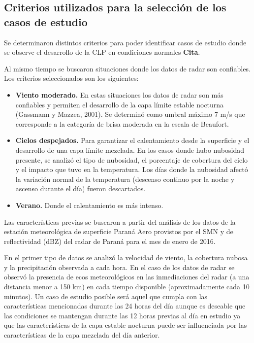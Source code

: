 \documentclass[12pt,spanish,oneside]{book}
\providecommand{\tightlist}{%
  \setlength{\itemsep}{0pt}\setlength{\parskip}{0pt}}
\begin{document}
\subsection{\texorpdfstring{Criterios utilizados para la selección de
los casos de estudio
\label{sec-criterios}}{Criterios utilizados para la selección de los casos de estudio }}\label{criterios-utilizados-para-la-seleccion-de-los-casos-de-estudio}

Se determinaron distintos criterios para poder identificar casos de
estudio donde se observe el desarrollo de la CLP en condiciones normales
\textbf{Cita}.

Al mismo tiempo se buscaron situaciones donde los datos de radar son
confiables. Los criterios seleccionados son los siguientes:

\begin{itemize}
\tightlist
\item
  \textbf{Viento moderado.} En estas situaciones los datos de radar son
  más confiables y permiten el desarrollo de la capa límite estable
  nocturna (Gassmann y Mazzea, 2001). Se determinó como umbral máximo 7
  m/s que corresponde a la categoría de brisa moderada en la escala de
  Beaufort.
\item
  \textbf{Cielos despejados.} Para garantizar el calentamiento desde la
  superficie y el desarrollo de una capa límite mezclada. En los casos
  donde hubo nubosidad presente, se analizó el tipo de nubosidad, el
  porcentaje de cobertura del cielo y el impacto que tuvo en la
  temperatura. Los días donde la nubosidad afectó la variación normal de
  la temperatura (descenso continuo por la noche y ascenso durante el
  día) fueron descartados.
\item
  \textbf{Verano.} Donde el calentamiento es más intenso.
\end{itemize}

Las características previas se buscaron a partir del análisis de los
datos de la estación meteorológica de superficie Paraná Aero provistos
por el SMN y de reflectividad (dBZ) del radar de Paraná para el mes de
enero de 2016.

En el primer tipo de datos se analizó la velocidad de viento, la
cobertura nubosa y la precipitación observada a cada hora. En el caso de
los datos de radar se observó la presencia de ecos meteorológicos en las
inmediaciones del radar (a una distancia menor a 150 km) en cada tiempo
disponible (aproximadamente cada 10 minutos). Un caso de estudio posible
será aquel que cumpla con las características mencionadas durante las 24
horas del día aunque es deseable que las condiciones se mantengan
durante las 12 horas previas al día en estudio ya que las
características de la capa estable nocturna puede ser influenciada por
las características de la capa mezclada del día anterior.
\end{document}
